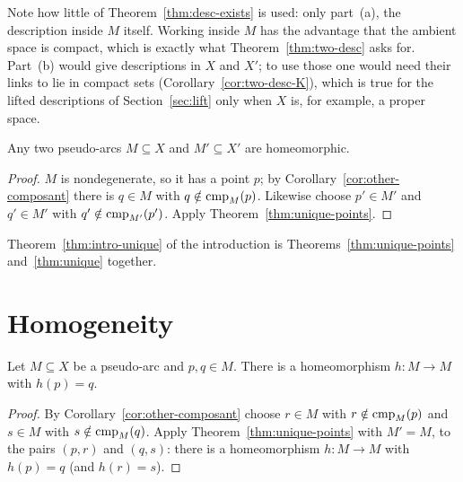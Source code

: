 
\begin{remark}
Note how little of Theorem~\ref{thm:desc-exists} is used: only part~(a), the description
inside $M$ itself. Working inside $M$ has the advantage that the ambient space is compact, which
is exactly what Theorem~\ref{thm:two-desc} asks for. Part~(b) would give descriptions in $X$ and
$X'$; to use those one would need their links to lie in compact sets
(Corollary~\ref{cor:two-desc-K}), which is true for the lifted descriptions of
Section~\ref{sec:lift} only when $X$ is, for example, a proper space.
\end{remark}

\begin{theorem}\label{thm:unique}
Any two pseudo-arcs $M\subseteq X$ and $M'\subseteq X'$ are homeomorphic.
\end{theorem}

\begin{proof}
$M$ is nondegenerate, so it has a point $p$; by Corollary~\ref{cor:other-composant} there is
$q\in M$ with $q\notin\operatorname{cmp}_{M}(p)$. Likewise choose $p'\in M'$ and $q'\in M'$ with
$q'\notin\operatorname{cmp}_{M'}(p')$. Apply Theorem~\ref{thm:unique-points}.
\end{proof}


Theorem~\ref{thm:intro-unique} of the introduction is Theorems~\ref{thm:unique-points}
and~\ref{thm:unique} together.

\section{Homogeneity}\label{sec:main-homog}

\begin{theorem}\label{thm:homog}
Let $M\subseteq X$ be a pseudo-arc and $p,q\in M$. There is a homeomorphism $h\colon M\to M$ with
$h(p)=q$.
\end{theorem}

\begin{proof}
By Corollary~\ref{cor:other-composant} choose $r\in M$ with $r\notin\operatorname{cmp}_{M}(p)$ and $s\in M$ with
$s\notin\operatorname{cmp}_{M}(q)$. Apply Theorem~\ref{thm:unique-points} with $M'=M$, to the pairs $(p,r)$ and
$(q,s)$: there is a homeomorphism $h\colon M\to M$ with $h(p)=q$ (and $h(r)=s$).
\end{proof}

